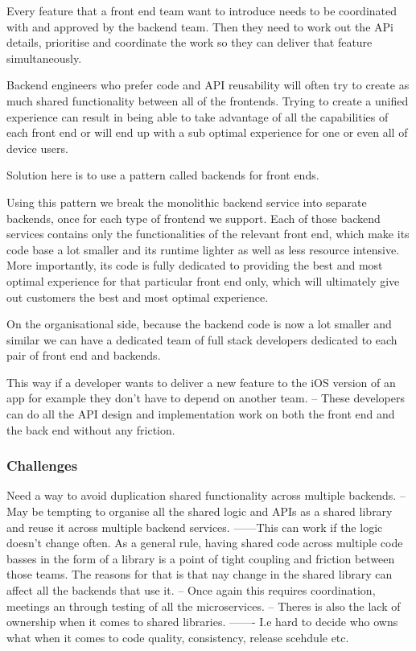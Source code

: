 \documentclass[a4paper, 11pt]{book}
\begin{document}
    Every feature that a front end team want to introduce needs to be coordinated with and approved by the backend team.
    Then they need to work out the APi details, prioritise and coordinate the work so they can deliver that feature simultaneously.

    Backend engineers who prefer code and API reusability will often try to create as much shared functionality between all of the frontends.
    Trying to create a unified experience can result in being able to take advantage of all the capabilities of each front end or will end up with a sub optimal experience for one or even all of device users.

    Solution here is to use a pattern called backends for front ends.

    Using this pattern we break the monolithic backend service into separate backends, once for each type of frontend we support.
    Each of those backend services contains only the functionalities of the relevant front end, which make its code base a lot smaller and its runtime lighter as well as less resource intensive.
    More importantly, its code is fully dedicated to providing the best and most optimal experience for that particular front end only, which will ultimately give out customers the best and most optimal experience.

    On the organisational side, because the backend code is now a lot smaller and similar we can have a dedicated team of full stack developers dedicated to each pair of front end and backends.

    This way if a developer wants to deliver a new feature to the iOS version of an app for example they don't have to depend on another team.
    -- These developers can do all the API design and implementation work on both the front end and the back end without any friction.

    \subsubsection{Challenges}
    Need a way to avoid duplication shared functionality across multiple backends.
    -- May be tempting to organise all the shared logic and APIs as a shared library and reuse it across multiple backend services.
    ------This can work if the logic doesn't change often.
    As a general rule, having shared code across multiple code basses in the form of a library is a point of tight coupling and friction between those teams.
    The reasons for that is that nay change in the shared library can affect all the backends that use it.
    -- Once again this requires coordination, meetings an through testing of all the microservices.
    -- Theres is also the lack of ownership when it comes to shared libraries.
    ------- I.e hard to decide who owns what when it comes to code quality, consistency, release scehdule etc.
\end{document}
